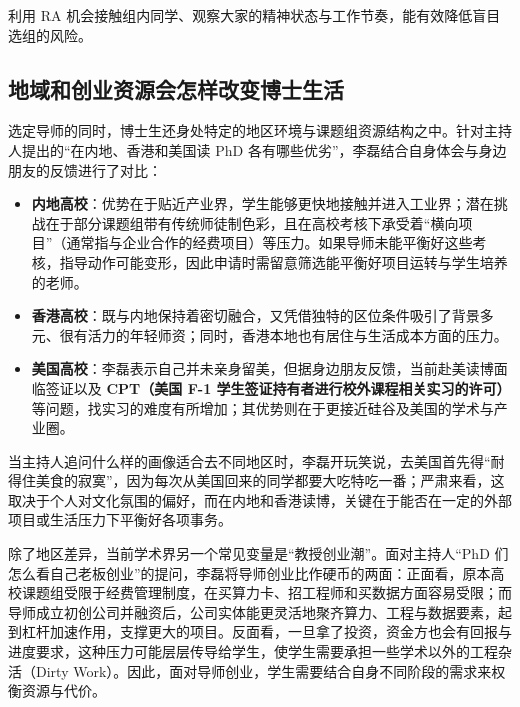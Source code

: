 \documentclass[UTF8,a4paper,11pt,fontset=fandol]{ctexart}
\begin{document}
利用 RA 机会接触组内同学、观察大家的精神状态与工作节奏，能有效降低盲目选组的风险。
\subsection{地域和创业资源会怎样改变博士生活}
选定导师的同时，博士生还身处特定的地区环境与课题组资源结构之中。针对主持人提出的“在内地、香港和美国读 PhD 各有哪些优劣”，李磊结合自身体会与身边朋友的反馈进行了对比：

\begin{itemize}
\item \textbf{内地高校}：优势在于贴近产业界，学生能够更快地接触并进入工业界；潜在挑战在于部分课题组带有传统师徒制色彩，且在高校考核下承受着“横向项目”（通常指与企业合作的经费项目）等压力。如果导师未能平衡好这些考核，指导动作可能变形，因此申请时需留意筛选能平衡好项目运转与学生培养的老师。
\item \textbf{香港高校}：既与内地保持着密切融合，又凭借独特的区位条件吸引了背景多元、很有活力的年轻师资；同时，香港本地也有居住与生活成本方面的压力。
\item \textbf{美国高校}：李磊表示自己并未亲身留美，但据身边朋友反馈，当前赴美读博面临签证以及 \textbf{CPT（美国 F-1 学生签证持有者进行校外课程相关实习的许可）} 等问题，找实习的难度有所增加；其优势则在于更接近硅谷及美国的学术与产业圈。
\end{itemize}

当主持人追问什么样的画像适合去不同地区时，李磊开玩笑说，去美国首先得“耐得住美食的寂寞”，因为每次从美国回来的同学都要大吃特吃一番；严肃来看，这取决于个人对文化氛围的偏好，而在内地和香港读博，关键在于能否在一定的外部项目或生活压力下平衡好各项事务。

除了地区差异，当前学术界另一个常见变量是“教授创业潮”。面对主持人“PhD 们怎么看自己老板创业”的提问，李磊将导师创业比作硬币的两面：正面看，原本高校课题组受限于经费管理制度，在买算力卡、招工程师和买数据方面容易受限；而导师成立初创公司并融资后，公司实体能更灵活地聚齐算力、工程与数据要素，起到杠杆加速作用，支撑更大的项目。反面看，一旦拿了投资，资金方也会有回报与进度要求，这种压力可能层层传导给学生，使学生需要承担一些学术以外的工程杂活（Dirty Work）。因此，面对导师创业，学生需要结合自身不同阶段的需求来权衡资源与代价。
\end{document}
